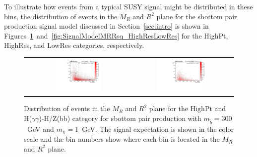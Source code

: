 To illustrate how events from a typical SUSY signal might be distributed in these
bins, the distribution of events in the $M_{R}$ and $R^{2}$ plane for 
the sbottom pair production signal model discussed in Section~\ref{sec:intro}
is shown in Figures~\ref{fig:SignalModelMRRsq_HighPt}~and~\ref{fig:SignalModelMRRsq_HighResLowRes}
for the HighPt, HighRes, and LowRes categories, respectively.

\begin{figure}[ht!]
\centering
 \begin{tabular}{cc}
\includegraphics[width=0.49\textwidth, angle=0.]{figs/SignalT2BH_300_1_MRRsq_highpt.pdf}  & 
\includegraphics[width=0.49\textwidth, angle=0.]{figs/SignalT2BH_300_1_MRRsq_hzbb.pdf}  
\end{tabular}
\caption{ Distribution of events in the $M_{R}$ and $R^{2}$ plane for the HighPt and
H($\gamma\gamma$)-H/Z(bb) category for sbottom pair production with 
$m_{\tilde{b}}=300$~GeV and $m_{\chi}=1$~GeV. The signal expectation is shown in the
color scale and the bin numbers show where each bin is located in the $M_{R}$ and $R^{2}$ plane. 
\label{fig:SignalModelMRRsq_HighPt}}
\end{figure}

